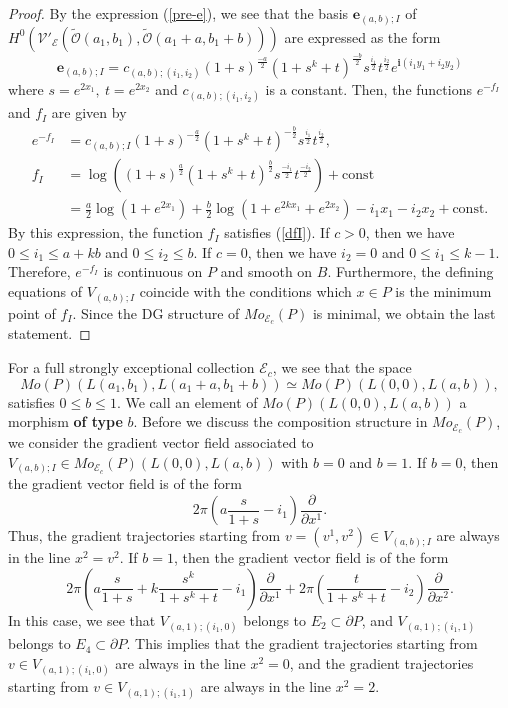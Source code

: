 \documentclass[12pt,reqno]{amsart}
\newcommand{\ii}{{\mathbf{i}}}
\newcommand{\ee}{{\mathbf{e}}}
\newcommand{\cO}{{\mathcal{O}}}
\newcommand{\cE}{{\mathcal{E}}}
\newcommand{\cV}{{\mathcal{V}}}
\newcommand{\del}{{\partial}}
\theoremstyle{definition}
\begin{document}
\begin{proof}
By the expression (\ref{pre-e}), we see that the basis $\ee_{(a,b);I}$ of $H^0(\cV'_\cE(\widetilde{\cO}(a_1,b_1),\widetilde{\cO}(a_1+a,b_1+b)))$ are expressed as the form
\begin{equation*}
\ee_{(a,b);I} =c_{(a,b);(i_1,i_2)}(1+s)^\frac{-a}{2}(1 + s^k + t)^\frac{-b}{2}s^\frac{i_1}{2}t^\frac{i_2}{2}e^{\ii(i_1y_1 + i_2y_2)}
\end{equation*}
where $s = e^{2 x_1},\ t= e^{2 x_2}$ and $c_{(a,b);(i_1,i_2)}$ is a constant. Then, the functions $e^{-f_I}$ and $f_I$ are given by
\begin{equation}\label{fI2}
\begin{split}
e^{-f_I}& = c_{(a,b);I}(1+s)^{-\frac{a}{2}}(1 + s^k + t)^{-\frac{b}{2}}s^\frac{i_1}{2}t^\frac{i_2}{2},\\
f_I  &= \log\left((1+s)^\frac{a}{2}(1 + s^k + t)^\frac{b}{2}s^\frac{-i_1}{2}t^\frac{-i_2}{2}\right) + \mbox{const}  \\
&= \frac{a}{2}\log(1+e^{2 x_1}) + \frac{b}{2}\log(1+e^{2k x_1}+e^{2 x_2}) -  i_1 x_1 -  i_2 x_2 + \mbox{const}.
\end{split}
\end{equation}
By this expression, the function $f_I$ satisfies (\ref{dfI}).
If $c>0$, then we have $0 \leq i_1 \leq a+kb$ and $0 \leq i_2 \leq b$.
If $c=0$, then we have $i_2=0$ and $0 \leq i_1 \leq k-1$.
Therefore, $e^{-f_I}$ is continuous on $P$ and smooth on $B$. Furthermore, the defining equations of $V_{(a,b);I}$ coincide with the conditions which $x\in P$ is the minimum point of $f_I$. Since the DG structure of $Mo_{\cE_c}(P)$ is minimal, we obtain the last statement.
\end{proof}

For a full strongly exceptional collection $\cE_c$, we see that the space
\begin{equation*}
Mo(P)(L(a_1,b_1),L(a_1+a,b_1+b)) \simeq Mo(P)(L(0,0),L(a,b)),
\end{equation*}
satisfies $0\leq b\leq 1$. We call an element of $ Mo(P)(L(0,0),L(a,b))$ a morphism {\bf of type} $b$. Before we discuss the composition structure in $ Mo_{\cE_c}(P)$, we consider the gradient vector field associated to $V_{(a,b);I}\in Mo_{\cE_c}(P)(L(0,0),L(a,b))$ with $b=0$ and $b=1$.
If $b=0$, then the gradient vector field is of the form
\begin{equation*}
2\pi\left(a\frac{s}{1+s}-i_1\right)\frac{\del}{\del x^1}.
\end{equation*}
Thus, the gradient trajectories starting from $v=(v^1,v^2)\in V_{(a,b);I}$ are always in the line $x^2=v^2$.
If $b=1$, then the gradient vector field is of the form
\begin{equation*}
2\pi\left(a\frac{s}{1+s} + k\frac{s^k}{1+s^k+t} - i_1\right)\frac{\del}{\del x^1} + 2\pi\left(\frac{t}{1+s^k+t} - i_2 \right)\frac{\del}{\del x^2}.
\end{equation*}
In this case, we see that $V_{(a,1);(i_1,0)}$ belongs to $E_2\subset\del P$, and $V_{(a,1);(i_1,1)}$ belongs to $E_4\subset\del P$. This implies that the gradient trajectories starting from $v\in V_{(a,1);(i_1,0)}$ are always in the line $x^2 = 0$, and the gradient trajectories starting from $v \in V_{(a,1);(i_1,1)}$ are always in the line $x^2 = 2$.
\end{document}
